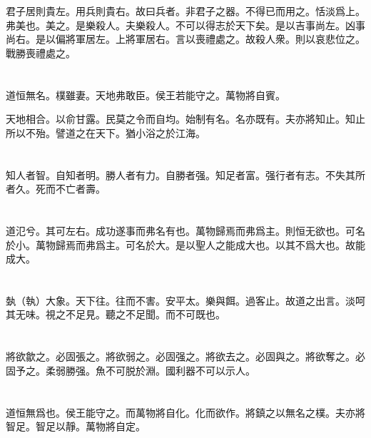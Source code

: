 \documentclass[a5paper]{ctexbook}
\begin{document}
    君子居則貴左。用兵則貴右。故曰兵者。非君子之器。不得已而用之。恬淡爲上。弗美也。美之。是樂殺人。夫樂殺人。不可以得志於天下矣。是以吉事尚左。凶事尚右。是以偏將軍居左。上將軍居右。言以喪禮處之。故殺人衆。則以哀悲位之。戰勝喪禮處之。

    \chapter{}

    道恒無名。樸雖妻。天地弗敢臣。侯王若能守之。萬物將自賓。

    天地相合。以俞甘露。民莫之令而自均。始制有名。名亦既有。夫亦將知止。知止所以不殆。譬道之在天下。猶小浴之於江海。

    \chapter{}

    知人者智。自知者明。勝人者有力。自勝者强。知足者富。强行者有志。不失其所者久。死而不亡者壽。

    \chapter{}

    道氾兮。其可左右。成功遂事而弗名有也。萬物歸焉而弗爲主。則恒无欲也。可名於小。萬物歸焉而弗爲主。可名於大。是以聖人之能成大也。以其不爲大也。故能成大。

    \chapter{}

    埶（執）大象。天下往。往而不害。安平太。樂與餌。過客止。故道之出言。淡呵其无味。視之不足見。聽之不足聞。而不可既也。

    \chapter{}

    將欲歙之。必固張之。將欲弱之。必固强之。將欲去之。必固與之。將欲奪之。必固予之。柔弱勝强。魚不可脱於淵。國利器不可以示人。

    \chapter{}

    道恒無爲也。侯王能守之。而萬物將自化。化而欲作。將鎮之以無名之樸。夫亦將智足。智足以靜。萬物將自定。
\end{document}

